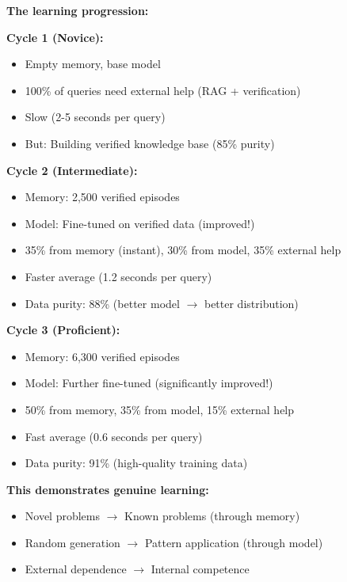 \documentclass[12pt,a4paper]{article}
\theoremstyle{definition}
\begin{document}
\begin{intuitionbox}
\textbf{The learning progression:}

\textbf{Cycle 1 (Novice):}
\begin{itemize}
    \item Empty memory, base model
    \item 100\% of queries need external help (RAG + verification)
    \item Slow (2-5 seconds per query)
    \item But: Building verified knowledge base (85\% purity)
\end{itemize}

\textbf{Cycle 2 (Intermediate):}
\begin{itemize}
    \item Memory: 2,500 verified episodes
    \item Model: Fine-tuned on verified data (improved!)
    \item 35\% from memory (instant), 30\% from model, 35\% external help
    \item Faster average (1.2 seconds per query)
    \item Data purity: 88\% (better model $\rightarrow$ better distribution)
\end{itemize}

\textbf{Cycle 3 (Proficient):}
\begin{itemize}
    \item Memory: 6,300 verified episodes
    \item Model: Further fine-tuned (significantly improved!)
    \item 50\% from memory, 35\% from model, 15\% external help
    \item Fast average (0.6 seconds per query)
    \item Data purity: 91\% (high-quality training data)
\end{itemize}

\textbf{This demonstrates genuine learning:}
\begin{itemize}
    \item Novel problems $\rightarrow$ Known problems (through memory)
    \item Random generation $\rightarrow$ Pattern application (through model)
    \item External dependence $\rightarrow$ Internal competence
\end{itemize}
\end{intuitionbox}
\end{document}
